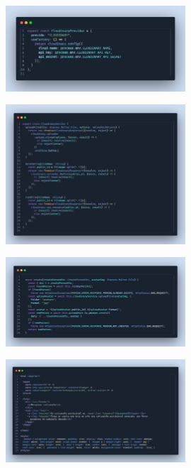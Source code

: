 \label{apendix:configuracion-cloudinary-api}
\begin{figure}[H]
    \centering
    \includegraphics[width=0.6\textwidth]{chapters/appendices/code/configuracion-cloudinary-api.png}
\end{figure}


\label{apendix:subida-imagenes-api}
\begin{figure}[H]
    \centering
    \includegraphics[width=0.6\textwidth]{chapters/appendices/code/subida-imagenes-api.png}
\end{figure}


\label{apendix:subida-imagenes-usuario-api}
\begin{figure}[H]
    \centering
    \includegraphics[width=0.6\textwidth]{chapters/appendices/code/subida-imagenes-usuario-api.png}
\end{figure}


\label{apendix:plantilla-correo-api}
\begin{figure}[H]
    \centering
    \includegraphics[width=0.6\textwidth]{chapters/appendices/code/plantilla-correo-api.png}
\end{figure}



